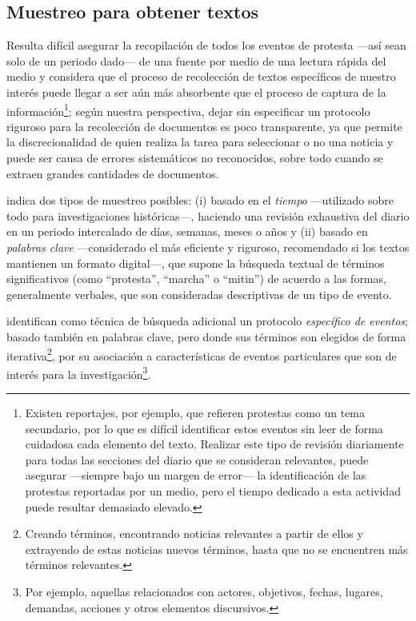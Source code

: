 \documentclass[letterpaper, 11pt]{book}
\theoremstyle{definition}
\theoremstyle{remark}
\begin{document}
\subsection{Muestreo para obtener textos}
\label{sec:AEP_MuestreoTextos}

Resulta difícil asegurar la recopilación de todos los eventos de protesta ---así sean solo de un periodo dado--- de una fuente por medio de una lectura rápida del medio y \citet{2014_Hutter_AEP} considera que el proceso de recolección de textos específicos de nuestro interés puede llegar a ser aún más absorbente que el proceso de captura de la información\footnote{Existen reportajes, por ejemplo, que refieren protestas como un tema secundario, por lo que es difícil identificar estos eventos sin leer de forma cuidadosa cada elemento del texto. 
Realizar este tipo de revisión diariamente para todas las secciones del diario que se consideran relevantes, puede asegurar ---siempre bajo un margen de error--- la identificación de las protestas reportadas por un medio, pero el tiempo dedicado a esta actividad puede resultar demasiado elevado.}; según nuestra perspectiva, dejar sin especificar un protocolo riguroso para la recolección de documentos es poco transparente, ya que permite la discrecionalidad de quien realiza la tarea para seleccionar o no una noticia y puede ser causa de errores sistemáticos no reconocidos, sobre todo cuando se extraen grandes cantidades de documentos. 

\citet{2003_Wada_Tesis} indica dos tipos de muestreo posibles: (i) basado en el \emph{tiempo} ---utilizado sobre todo para investigaciones históricas---, haciendo una revisión exhaustiva del diario en un periodo intercalado de días, semanas, meses o años y (ii) basado en \emph{palabras clave} ---considerado el más eficiente y riguroso, recomendado si los textos mantienen un formato digital---, que supone la búsqueda textual de términos significativos (como ``protesta'', ``marcha'' o ``mitin'') de acuerdo a las formas, generalmente verbales, que son consideradas descriptivas de un tipo de evento.

\citet{2001_Maney_Oliver__FindingEvents} identifican como técnica de búsqueda adicional un protocolo \emph{específico de eventos}; basado también en palabras clave, pero donde sus términos son elegidos de forma iterativa\footnote{
Creando términos, encontrando noticias relevantes a partir de ellos y extrayendo de estas noticias nuevos términos, hasta que no se encuentren más términos relevantes.}, 
por su asociación a características de eventos particulares que son de interés para la investigación\footnote{
Por ejemplo, aquellas relacionados con actores, objetivos, fechas, lugares, demandas, acciones y otros elementos discursivos.}. 
\end{document}
